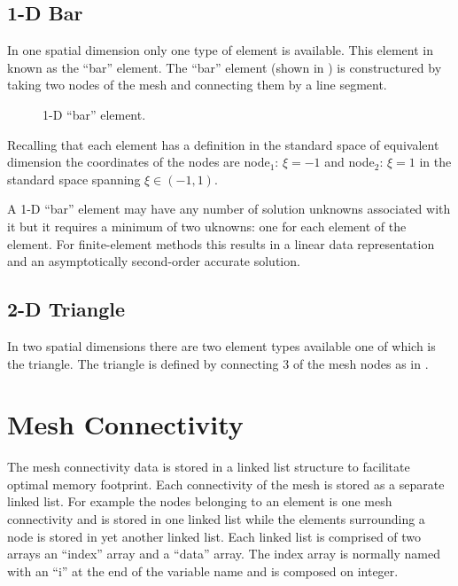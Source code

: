 \subsection{1-D Bar}
In one spatial dimension only one type of element is available.  This element in known as the ``bar'' element.  The ``bar'' element (shown in ) is constructured by taking two nodes of the mesh and connecting them by a line segment.  
\begin{figure}[h!]
\centering
{}
\caption{1-D ``bar'' element.}
\label{fig:c3_line}
\end{figure}

Recalling that each element has a definition in the standard space of equivalent dimension the coordinates of the nodes are node$_{1}$: $\xi = -1$ and node$_{2}$: $\xi = 1$ in the standard space spanning $\xi \in (-1,1)$.  

A 1-D ``bar'' element may have any number of solution unknowns associated with it but it requires a minimum of two uknowns: one for each element of the element.  For finite-element methods this results in a linear data representation and an asymptotically second-order accurate solution.  

\subsection{2-D Triangle}
In two spatial dimensions there are two element types available one of which is the triangle.  The triangle is defined by connecting 3 of the mesh nodes as in .  

 



\section{Mesh Connectivity}
The mesh connectivity data is stored in a linked list structure to facilitate optimal memory footprint.  Each connectivity of the mesh is stored as a separate linked list.  For example the nodes belonging to an element is one mesh connectivity and is stored in one linked list while the elements surrounding a node is stored in yet another linked list.  Each linked list is comprised of two arrays an ``index'' array and a ``data'' array.  The index array is normally named with an ``i'' at the end of the variable name and is composed on integer. 

